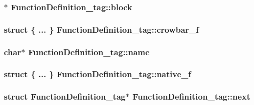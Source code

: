 \subsubsection[{block}]{$\ast$ Function\+Definition\+\_\+tag\+::block}\label{struct_function_definition__tag_a63493f81a30a92680126bbb0a6331816}
\hypertarget{struct_function_definition__tag_ac903298e1aeddc0d693b5591f3f127e3}{}
\subsubsection[{crowbar\+\_\+f}]{\setlength{\rightskip}{0pt plus 5cm}struct \{ ... \}   Function\+Definition\+\_\+tag\+::crowbar\+\_\+f}\label{struct_function_definition__tag_ac903298e1aeddc0d693b5591f3f127e3}
\hypertarget{struct_function_definition__tag_ac86d561cdc103d16dc92445651fbde2f}{}
\subsubsection[{name}]{\setlength{\rightskip}{0pt plus 5cm}char$\ast$ Function\+Definition\+\_\+tag\+::name}\label{struct_function_definition__tag_ac86d561cdc103d16dc92445651fbde2f}
\hypertarget{struct_function_definition__tag_a47669f5b5a90c174a8074dcee352b889}{}
\subsubsection[{native\+\_\+f}]{\setlength{\rightskip}{0pt plus 5cm}struct \{ ... \}   Function\+Definition\+\_\+tag\+::native\+\_\+f}\label{struct_function_definition__tag_a47669f5b5a90c174a8074dcee352b889}
\hypertarget{struct_function_definition__tag_ab9569f0ddbe305b4c58fdc673f0afd01}{}
\subsubsection[{next}]{\setlength{\rightskip}{0pt plus 5cm}struct {\bf Function\+Definition\+\_\+tag}$\ast$ Function\+Definition\+\_\+tag\+::next}\label{struct_function_definition__tag_ab9569f0ddbe305b4c58fdc673f0afd01}
\hypertarget{struct_function_definition__tag_a920e515da65f6d48e75864181108dba4}{}
